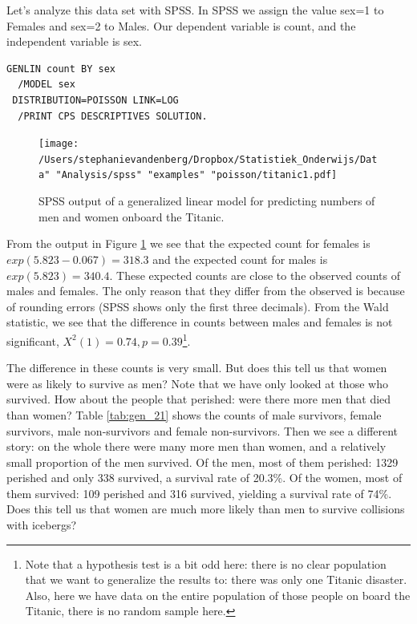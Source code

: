 \documentclass[]{book}\usepackage[]{graphicx}\usepackage[]{color}
\begin{document}
Let's analyze this data set with SPSS. In SPSS we assign the value sex=1 to Females and sex=2 to Males. Our dependent variable is count, and the independent variable is sex.

\begin{verbatim}
GENLIN count BY sex
  /MODEL sex
 DISTRIBUTION=POISSON LINK=LOG
  /PRINT CPS DESCRIPTIVES SOLUTION.
\end{verbatim}


\begin{figure}[h]
    \begin{center}
       \texttt{[image: /Users/stephanievandenberg/Dropbox/Statistiek\_Onderwijs/Data" "Analysis/spss" "examples" "poisson/titanic1.pdf]}
    \end{center}
     \caption{SPSS output of a generalized linear model for predicting numbers of men and women onboard the Titanic.}
    \label{fig:titanic1}
\end{figure}


From the output in Figure \ref{fig:titanic1} we see that the expected count for females is $exp(5.823-0.067)=318.3$ and the expected count for males is $exp(5.823)=340.4$. These expected counts are close to the observed counts of males and females. The only reason that they differ from the observed is because of rounding errors (SPSS shows only the first three decimals). From the Wald statistic, we see that the difference in counts between males and females is not significant, $X^2(1)=0.74, p=0.39$\footnote{Note that a hypothesis test is a bit odd here: there is no clear population that we want to generalize the results to: there was only one Titanic disaster. Also, here we have data on the entire population of those people on board the Titanic, there is no random sample here.}.

The difference in these counts is very small. But does this tell us that women were as likely to survive as men? Note that we have only looked at those who survived. How about the people that perished: were there more men that died than women? Table \ref{tab:gen_21} shows the counts of male survivors, female survivors, male non-survivors and female non-survivors. Then we see a different story: on the whole there were many more men than women, and a relatively small proportion of the men survived. Of the men, most of them perished: 1329 perished and only 338 survived, a survival rate of 20.3\%. Of the women, most of them survived: 109 perished and 316 survived, yielding a survival rate of 74\%. Does this tell us that women are much more likely than men to survive collisions with icebergs?
\end{document}

